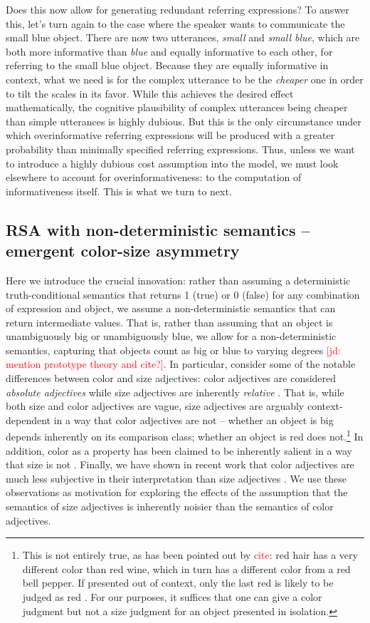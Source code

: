 \documentclass[11pt]{article}
\newcommand{\red}[1]{\textcolor{Red}{#1}}
\newcommand{\jd}[1]{\textcolor{Red}{[jd: #1]}}
\begin{document}
Does this now allow for generating redundant referring expressions? To answer this, let's turn again to the case where the speaker wants to communicate the small blue object. There are now two  utterances, \emph{small} and \emph{small blue}, which are both more informative than \emph{blue} and equally informative to each other, for referring to the small blue object. Because they are equally informative in context, what we need is for the complex utterance to be the \emph{cheaper} one in order to tilt the scales in its favor. While this achieves the desired effect mathematically, the cognitive plausibility of complex utterances being cheaper than simple utterances is highly dubious. But this is the only circumstance under which overinformative referring expressions will be produced with a greater probability than minimally specified referring expressions. Thus, unless we want to introduce a highly dubious cost assumption into the model, we must look elsewhere to account for overinformativeness: to the computation of informativeness itself. This is what we turn to next.

\subsection{RSA with non-deterministic semantics -- emergent color-size asymmetry}
\label{sec:modifiedmodel}

Here we introduce the crucial innovation: rather than assuming a deterministic truth-conditional semantics that returns 1 (true) or 0 (false) for any combination of expression and object, we assume a non-deterministic semantics that can return intermediate values. That is, rather than assuming that an object is unambiguously big or unambiguously blue, we allow for a non-deterministic semantics, capturing that objects count as big or blue to  varying degrees \jd{mention prototype theory and cite?}. In particular, consider some of the notable differences between color and size adjectives: color adjectives are considered  \emph{absolute adjectives} while size adjectives are inherently \emph{relative} \cite{kennedymcnally2005}. That is, while both size and color adjectives are vague, size adjectives are arguably context-dependent in a way that color adjectives are not -- whether an object is big depends inherently on its comparison class; whether an object is red does not.\footnote{This is not entirely true, as has been pointed out by \red{cite}: red hair has a very different color than red wine, which in turn has a different color from a red bell pepper. If presented out of context, only the last red is likely to be judged as red \cite{is there a ref?}. For our purposes, it suffices that one can give a color judgment but not a size judgment for an object presented in isolation.} In addition, color as a property has been claimed to be inherently salient in a way that size is not \cite{arts2011,gattetal2013}. Finally, we have shown in recent work that color adjectives are much less subjective in their interpretation than size adjectives \cite{scontrasunderreview}. We use these observations as motivation for exploring the effects of the assumption that the semantics of size adjectives is inherently noisier than the semantics of color adjectives.
\end{document}
